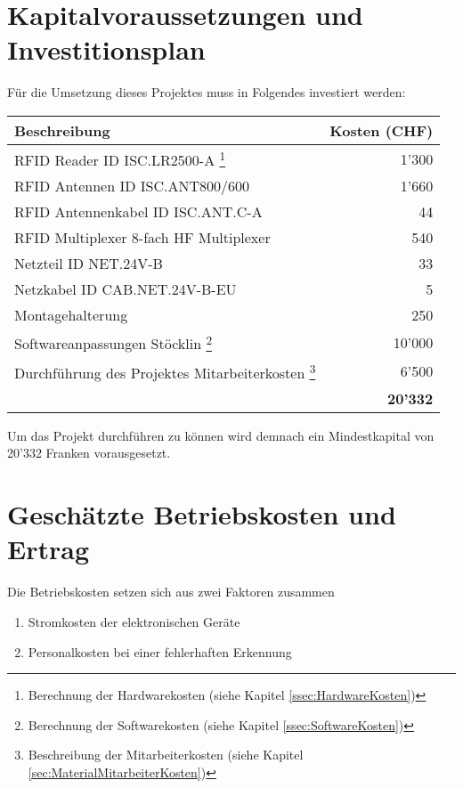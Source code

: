 \chapter{Kapitalvoraussetzungen und Investitionsplan}
Für die Umsetzung dieses Projektes muss in Folgendes investiert werden:

\vspace{1em}

\begin{tabularx}{\textwidth}{|X|r|}
	\hline
	\textbf{Beschreibung} & \textbf{Kosten (CHF)} \\
	\hline
	RFID Reader ID ISC.LR2500-A \footnote{\label{fn:HardwareKosten}Berechnung der Hardwarekosten (siehe Kapitel \ref{ssec:HardwareKosten})} & 1'300 \\
	\hline
	RFID Antennen ID ISC.ANT800/600 \footnotemark[1] & 1'660 \\
	\hline
	RFID Antennenkabel ID ISC.ANT.C-A \footnotemark[1] & 44 \\
	\hline
	RFID Multiplexer 8-fach HF Multiplexer \footnotemark[1] & 540 \\
	\hline
	Netzteil ID NET.24V-B \footnotemark[1] & 33 \\
	\hline
	Netzkabel ID CAB.NET.24V-B-EU \footnotemark[1] & 5 \\
	\hline
	Montagehalterung \footnotemark[1] & 250 \\
	\hline
	Softwareanpassungen Stöcklin \footnote{Berechnung der Softwarekosten (siehe Kapitel \ref{ssec:SoftwareKosten})} & 10'000 \\
	\hline
	Durchführung des Projektes Mitarbeiterkosten \footnote{Beschreibung der Mitarbeiterkosten (siehe Kapitel \ref{sec:MaterialMitarbeiterKosten})}  & 6'500 \\
	\hline
	\hline
	 & \textbf{20'332} \\
	 \hline
\end{tabularx}

\vspace{1em}

Um das Projekt durchführen zu können wird demnach ein Mindestkapital von 20'332 Franken vorausgesetzt.

\chapter{Geschätzte Betriebskosten und Ertrag}
Die Betriebskosten setzen sich aus zwei Faktoren zusammen
\begin{enumerate}
	\item Stromkosten der elektronischen Geräte
	\item Personalkosten bei einer fehlerhaften Erkennung
\end{enumerate}

